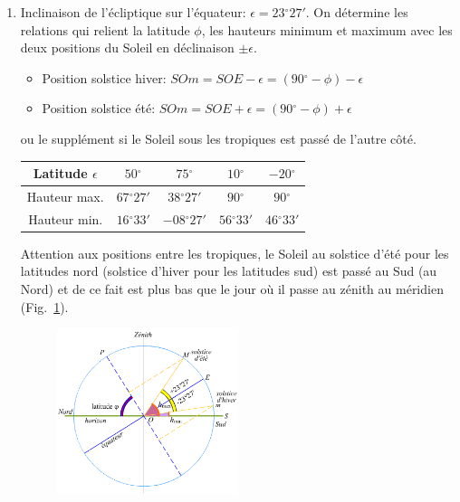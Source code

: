 \documentclass[a4paper,10pt]{report}
\renewcommand{\deg}{\ensuremath{^{\circ}}}
\begin{document}
\begin{Answer}
  \begin{enumerate}
  \item Inclinaison de l'écliptique sur l'équateur:
    $\epsilon=23\deg27'$. On détermine les relations qui relient la
    latitude $\phi$, les hauteurs minimum et maximum avec les deux
    positions du Soleil en déclinaison $\pm \epsilon$.
    \begin{itemize}
    \item Position solstice hiver: $SOm = SOE - \epsilon =
      (90\deg-\phi) -\epsilon$
    \item Position solstice été: $SOm = SOE + \epsilon =
      (90\deg-\phi) +\epsilon$
    \end{itemize}
    ou le supplément si le Soleil sous les tropiques est passé de
    l'autre côté.
    \begin{center}
      \begin{tabular}{|c|c|c|c|c|}
        \hline
        Latitude $\epsilon$ & $50\deg$ & $75\deg$ & $10\deg$ &
        $-20\deg$ \\
        \hline
        Hauteur max. & $67\deg27'$ & $38\deg27'$ & $90\deg$ &
        $90\deg$ \\
        \hline
        Hauteur min. & $16\deg33'$ & $-08\deg27'$ & $56\deg33'$
        & $46\deg33'$ \\
        \hline
      \end{tabular}
    \end{center}
    Attention aux positions entre les tropiques, le Soleil au solstice
    d'été pour les latitudes nord (solstice d'hiver pour les latitudes
    sud) est passé au Sud (au Nord) et de ce fait est plus bas que le
    jour où il passe au zénith au méridien (Fig.~\ref{mvtsolaire}).

    \begin{figure}[htp]
      \centering
      \includegraphics[width=0.5\textwidth]{mvt_soleil}
      \label{mvtsolaire}
      \caption{}
    \end{figure}


\end{enumerate}
\end{Answer}
\end{document}
